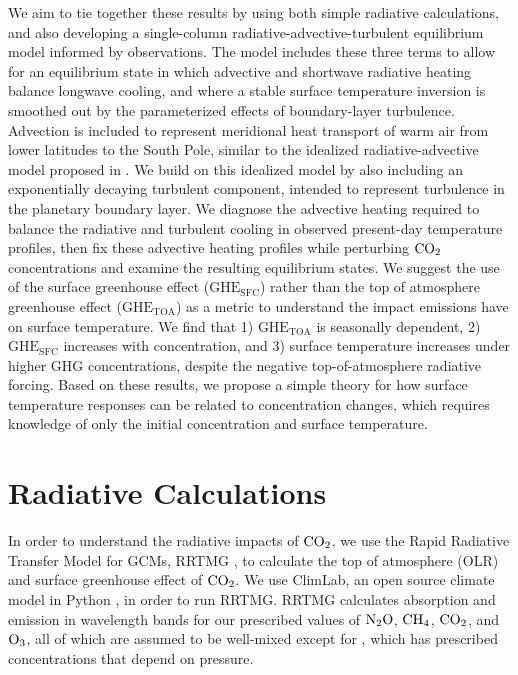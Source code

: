 \documentclass[draft]{agujournal2019}
\begin{document}
We aim to tie together these results by using both simple radiative calculations, and also developing a single-column radiative-advective-turbulent equilibrium model informed by observations. The model includes these three terms to allow for an equilibrium state in which advective and shortwave radiative heating balance longwave cooling, and where a stable surface temperature inversion is smoothed out by the parameterized effects of boundary-layer turbulence. Advection is included to represent meridional heat transport of warm air from lower latitudes to the South Pole, similar to the idealized radiative-advective model proposed in . We build on this idealized model by also including an exponentially decaying turbulent component, intended to represent turbulence in the planetary boundary layer. We diagnose the advective heating required to balance the radiative and turbulent cooling in observed present-day temperature profiles, then fix these advective heating profiles while perturbing $\ce{CO_2}$ concentrations and examine the resulting equilibrium states. We suggest the use of the surface greenhouse effect ($\text{GHE}_\text{{SFC}}$) rather than the top of atmosphere greenhouse effect ($\text{GHE}_\text{{TOA}}$) as a metric to understand the impact  emissions have on surface temperature. We find that 1) $\text{GHE}_\text{{TOA}}$ is seasonally dependent, 2) $\text{GHE}_{\text{SFC}}$ increases with  concentration, and 3) surface temperature increases under higher GHG concentrations, despite the negative top-of-atmosphere radiative forcing. Based on these results, we propose a simple theory for how surface temperature responses can be related to  concentration changes, which requires knowledge of only the initial  concentration and surface temperature.

\section{Radiative Calculations}

In order to understand the radiative impacts of $\ce{CO_2}$, we use the Rapid Radiative Transfer Model for GCMs, RRTMG \cite{mlawer_radiative_1997}, to calculate the top of atmosphere (OLR) and surface greenhouse effect of $\ce{CO_2}$. We use ClimLab, an open source climate model in Python \cite{rose_climlab_2018}, in order to run RRTMG. RRTMG calculates absorption and emission in wavelength bands for our prescribed values of $\ce{N_2O}$, $\ce{CH_4}$, $\ce{CO_2}$, and $\ce{O_3}$, all of which are assumed to be well-mixed except for , which has prescribed concentrations that depend on pressure. 
\end{document}
